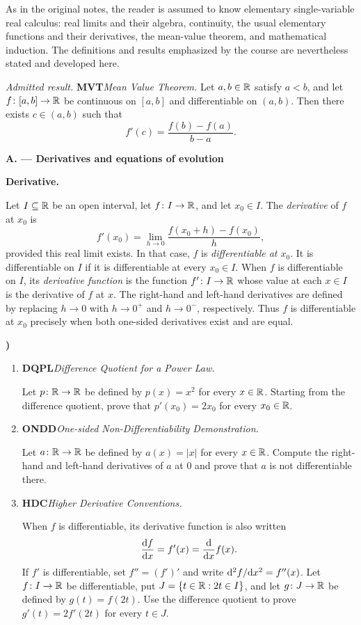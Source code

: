 \documentclass[10pt,a4paper]{article}
\newcounter{examquestion}
\newcommand{\examquestion}[1]{%
  \Needspace{5\baselineskip}%
  \refstepcounter{examquestion}%
  \par\addvspace{0.8\baselineskip}%
  \noindent\textbf{\theexamquestion)}\enspace #1\par
}
\newenvironment{subquestions}
  {\begin{enumerate}[label=\alph*),leftmargin=2.1em]}
  {\end{enumerate}}
\newcommand{\nameditem}[2]{%
  \textbf{\textsf{#1}}\enspace\emph{#2.}\enspace
}
\newcommand{\admitted}[3]{%
  \par\smallskip\noindent\emph{Admitted result.}\enspace
  \nameditem{#1}{#2}#3\par
}
\newcommand{\concept}[1]{%
  \par\addvspace{0.55\baselineskip}\noindent\textbf{#1.}\enspace
}
\newcommand{\subpart}[1]{%
  \begin{center}
    \textbf{#1}
  \end{center}
}
\begin{document}
As in the original notes, the reader is assumed to know elementary
single-variable real calculus: real limits and their algebra, continuity, the
usual elementary functions and their derivatives, the mean-value theorem,
and mathematical induction.  The definitions and results emphasized by the
course are nevertheless stated and developed here.

\admitted{MVT}{Mean Value Theorem}{Let $a,b\in\mathbb{R}$ satisfy $a<b$, and let
$f\colon[a,b]\to\mathbb{R}$ be continuous on $[a,b]$ and differentiable on
$(a,b)$.  Then there exists $c\in(a,b)$ such that
\[
  f'(c)=\frac{f(b)-f(a)}{b-a}.
\]}

\subpart{A. --- Derivatives and equations of evolution}

\concept{Derivative}
Let $I\subseteq\mathbb{R}$ be an open interval, let $f\colon I\to\mathbb{R}$, and let
$x_0\in I$.  The \emph{derivative} of $f$ at $x_0$ is
\[
  f'(x_0)=\lim_{h\to0}\frac{f(x_0+h)-f(x_0)}{h},
\]
provided this real limit exists.  In that case, $f$ is
\emph{differentiable at $x_0$}.  It is differentiable on $I$ if it is
differentiable at every $x_0\in I$.  When $f$ is differentiable on $I$, its
\emph{derivative function} is the function $f'\colon I\to\mathbb{R}$ whose value at
each $x\in I$ is the derivative of $f$ at $x$.  The right-hand and left-hand
derivatives
are defined by replacing $h\to0$ with $h\to0^+$ and $h\to0^-$,
respectively.  Thus $f$ is differentiable at $x_0$ precisely when both
one-sided derivatives exist and are equal.

\examquestion{\label{q:derivative}
\begin{subquestions}
  \item \nameditem{DQPL}{Difference Quotient for a Power Law}
  Let $p\colon\mathbb{R}\to\mathbb{R}$ be defined by $p(x)=x^2$ for every $x\in\mathbb{R}$.
  Starting from the difference quotient, prove that $p'(x_0)=2x_0$
  for every $x_0\in\mathbb{R}$.

  \item \nameditem{ONDD}{One-sided Non-Differentiability Demonstration}
  Let $a\colon\mathbb{R}\to\mathbb{R}$ be defined by $a(x)=|x|$ for every $x\in\mathbb{R}$.
  Compute the right-hand and left-hand derivatives of $a$ at $0$ and
  prove that $a$ is not differentiable there.

  \item \nameditem{HDC}{Higher Derivative Conventions}
  When $f$ is differentiable, its derivative function is also written
  \[
    \frac{\mathrm{d} f}{\mathrm{d} x}=f'(x)=\frac{\mathrm{d}}{\mathrm{d} x}f(x).
  \]
  If $f'$ is differentiable, set
  $f''=(f')'$ and write
  $\mathrm{d}^2f/\mathrm{d} x^2=f''(x)$.
  Let $f\colon I\to\mathbb{R}$ be differentiable, put
  $J=\{t\in\mathbb{R}:2t\in I\}$, and let $g\colon J\to\mathbb{R}$ be defined by
  $g(t)=f(2t)$.  Use the difference quotient to prove
  $g'(t)=2f'(2t)$ for every $t\in J$.
\end{subquestions}}
\end{document}
